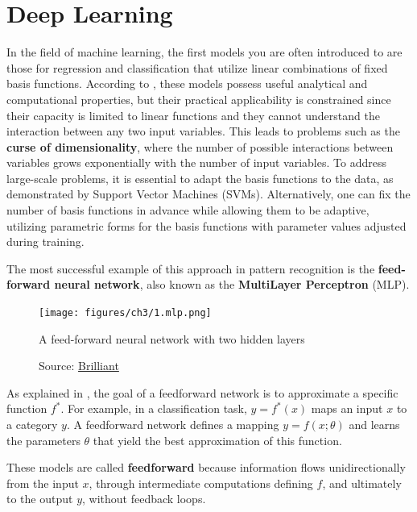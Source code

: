 \section{Deep Learning}
\label{sec:dl}

In the field of machine learning, the first models you
are often introduced to are those for regression
and classification that utilize linear
combinations of fixed basis functions.
According to \cite{Bishop:2008aa},
these models possess useful analytical and computational properties,
but their practical applicability is constrained 
since their capacity is limited to linear functions
and they cannot understand the interaction between any two input variables.
This leads to problems such as the \textbf{curse of dimensionality},
where the number of possible interactions between variables grows exponentially
with the number of input variables.
To address large-scale problems, it is essential to adapt the basis functions
to the data, as demonstrated by Support Vector Machines (SVMs).
Alternatively, one can fix the number of basis functions in advance while
allowing them to be adaptive, utilizing parametric forms for the basis
functions with parameter values adjusted during training.

The most successful example of this approach in pattern recognition is the
\textbf{feed-forward neural network},
also known as the \textbf{MultiLayer Perceptron} (MLP).
\begin{figure}[h]
    \centering
    \texttt{[image: figures/ch3/1.mlp.png]}
    \caption{A feed-forward neural network with two hidden layers}
    \vspace{-10px}
    \caption*{\scriptsize{Source: \href{https://brilliant.org/wiki/feedforward-neural-networks/}{Brilliant}}}
    \label{fig:mlp}
\end{figure}

As explained in 
\cite{goodfellow2016deep},
the goal of a feedforward network is to approximate a specific function
\( f^* \). For example, in a classification task,
\( y = f^*(x) \) maps an input \( x \) to a category \( y \).
A feedforward network defines a mapping \( y = f(x; \theta) \) and
learns the parameters \( \theta \) that yield the best approximation
of this function.

These models are called \textbf{feedforward} because information
flows unidirectionally from the input \( x \), through intermediate computations
defining \( f \), and ultimately to the output \( y \), without feedback loops.

